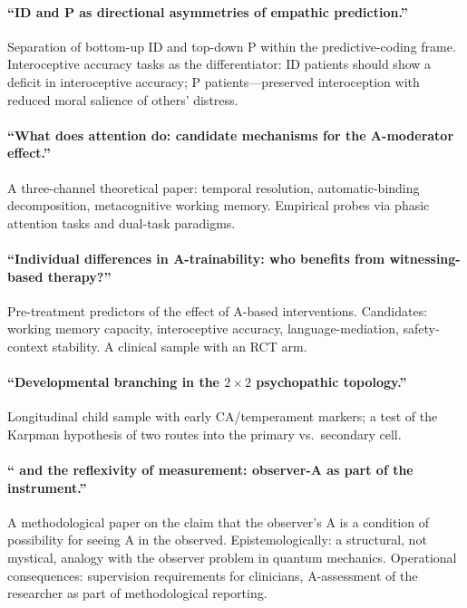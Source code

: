 \paragraph{``ID and P as directional asymmetries of empathic prediction.''} Separation of bottom-up ID and top-down P within the predictive-coding frame. Interoceptive accuracy tasks as the differentiator: ID patients should show a deficit in interoceptive accuracy; P patients---preserved interoception with reduced moral salience of others' distress.

\paragraph{``What does attention do: candidate mechanisms for the A-moderator effect.''} A three-channel theoretical paper: temporal resolution, automatic-binding decomposition, metacognitive working memory. Empirical probes via phasic attention tasks and dual-task paradigms.

\paragraph{``Individual differences in A-trainability: who benefits from witnessing-based therapy?''} Pre-treatment predictors of the effect of A-based interventions. Candidates: working memory capacity, interoceptive accuracy, language-mediation, safety-context stability. A clinical sample with an RCT arm.

\paragraph{``Developmental branching in the $2\times 2$ psychopathic topology.''} Longitudinal child sample with early CA/temperament markers; a test of the Karpman hypothesis of two routes into the primary vs.\ secondary cell.

\paragraph{``\DEIC{} and the reflexivity of measurement: observer-A as part of the instrument.''} A methodological paper on the claim that the observer's A is a condition of possibility for seeing A in the observed. Epistemologically: a structural, not mystical, analogy with the observer problem in quantum mechanics. Operational consequences: supervision requirements for clinicians, A-assessment of the researcher as part of methodological reporting.

